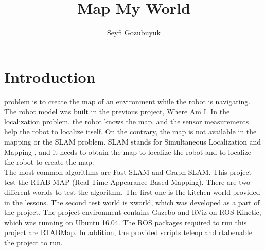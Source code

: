 \documentclass[10pt,journal,compsoc]{IEEEtran}
\begin{document}
\title{Map My World}

\author{Seyfi Gozubuyuk}

%
{}


\maketitle
\IEEEdisplaynontitleabstractindextext
\IEEEpeerreviewmaketitle
\section{Introduction}
\label{sec:introduction}

 problem is to create the map of an environment while the robot is navigating. The robot model was built in the previous project, Where Am I\cite{git:whereami}. In the localization problem, the robot knows the map, and the sensor measurements help the robot to localize itself. On the contrary, the map is not available in the mapping or the SLAM problem. SLAM stands for Simultaneous Localization and Mapping \cite{wiki:slam}, and it needs to obtain the map to localize the robot and to localize the robot to create the map.
\\
The most common algorithms are Fast SLAM and Graph SLAM. This project test the RTAB-MAP (Real-Time Appearance-Based Mapping)\cite{rtab}. There are two different worlds to test the algorithm. The first one is the kitchen world provided in the lessons. The second test world is xworld, which was developed as a part of the project.
The project environment contains Gazebo and RViz on ROS Kinetic, which was running on Ubuntu 16.04. The ROS packages required to run this project are RTABMap. In addition, the provided scripts teleop and rtab\textunderscore enable the project to run.
\end{document}
